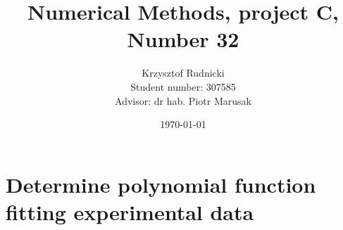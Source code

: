 \documentclass[12pt]{report}
\title{Numerical Methods, project C, Number 32}
\author{Krzysztof Rudnicki\\ Student number: 307585 \\ Advisor: dr hab. Piotr Marusak}
\date{\today}
\begin{document}
\maketitle
\tableofcontents

\chapter{Determine polynomial function fitting experimental data}
	
	
	
	
	
	
	
	
	
	
	
	
	
	
	
	
	
\end{document}
